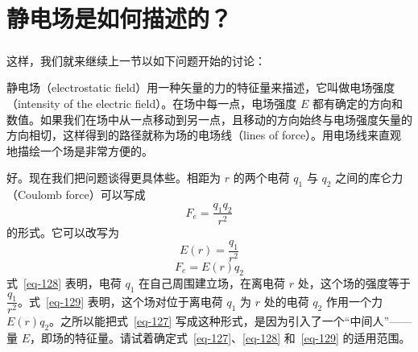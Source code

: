 
\chapter[静电场是如何描述的？]{静电场是如何描述的？\label{ch-23}}

\begin{dialogue}

\paragraph{}
\tchr 这样，我们就来继续上一节以如下问题开始的讨论：

\stdb 静电场（electrostatic field）用一种矢量的力的特征量来描述，它叫做电场强度（intensity of the electric field）。在场中每一点，电场强度 $E$ 都有确定的方向和数值。如果我们在场中从一点移动到另一点，且移动的方向始终与电场强度矢量的方向相切，这样得到的路径就称为场的电场线（lines of force）。用电场线来直观地描绘一个场是非常方便的。

\tchr 好。现在我们把问题谈得更具体些。相距为 $r$ 的两个电荷 $q_{1}$ 与 $q_{2}$ 之间的库仑力（Coulomb force）可以写成
\begin{equation}%
F_{e} = \frac{q_{1} q_{2}}{r^{2}}
\label{eq-127}
\end{equation}
的形式。它可以改写为
\begin{equation}%
E(r) =  \dfrac{q_{1}}{r^{2}}
\label{eq-128}
\end{equation}
\begin{equation}%
F_{e} = E(r) q_{2}
\label{eq-129}
\end{equation}
式~\eqref{eq-128} 表明，电荷 $q_{1}$ 在自己周围建立场，在离电荷 $r$ 处，这个场的强度等于 $\dfrac{q_{1}}{r^{2}}$。式~\eqref{eq-129} 表明，这个场对位于离电荷 $q_{1}$ 为 $r$ 处的电荷 $q_{2}$ 作用一个力 $E(r) q_{2}$。之所以能把式~\eqref{eq-127} 写成这种形式，是因为引入了一个“中间人”——量 $E$，即场的特征量。请试着确定式~\eqref{eq-127}、\eqref{eq-128} 和~\eqref{eq-129} 的适用范围。


\end{dialogue}
